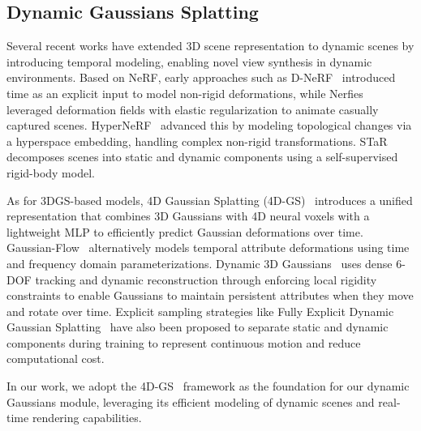 \subsection{Dynamic Gaussians Splatting}
Several recent works have extended 3D scene representation to dynamic scenes by introducing temporal modeling, enabling novel view synthesis in dynamic environments. Based on NeRF, early approaches such as D-NeRF~\cite{DNERF} introduced time as an explicit input to model non-rigid deformations, while Nerfies~\cite{nerfies} leveraged deformation fields with elastic regularization to animate casually captured scenes. HyperNeRF~\cite{HyperNeRF} advanced this by modeling topological changes via a hyperspace embedding, handling complex non-rigid transformations. STaR~\cite{star} decomposes scenes into static and dynamic components using a self-supervised rigid-body model. 

As for 3DGS-based models, 4D Gaussian Splatting (4D-GS)~\cite{4dgs} introduces a unified representation that combines 3D Gaussians with 4D neural voxels with a lightweight MLP to efficiently predict Gaussian deformations over time. Gaussian-Flow~\cite{gs-flow} alternatively models temporal attribute deformations using time and frequency domain parameterizations. Dynamic 3D Gaussians~\cite{dynamic3dgs} uses dense 6-DOF tracking and dynamic reconstruction through enforcing local rigidity constraints to enable Gaussians to maintain persistent attributes when they move and rotate over time. Explicit sampling strategies like Fully Explicit Dynamic Gaussian Splatting~\cite{fully} have also been proposed to separate static and dynamic components during training to represent continuous motion and reduce computational cost.

In our work, we adopt the 4D-GS~\cite{4dgs} framework as the foundation for our dynamic Gaussians module, leveraging its efficient modeling of dynamic scenes and real-time rendering capabilities.



